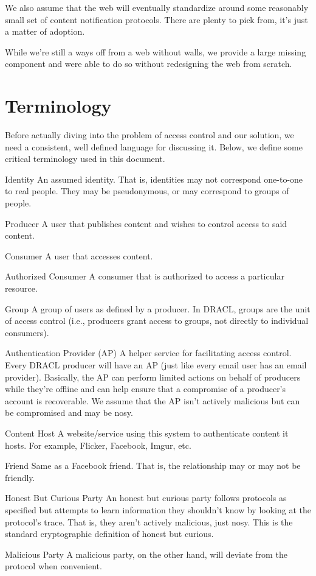 \documentclass[pdftex,12pt,a4papaer,twoside,notitlepage]{report}
\begin{document}
We also assume that the web will eventually standardize around some reasonably
small set of content notification protocols. There are plenty to pick from, it's
just a matter of adoption.

While we're still a ways off from a web without walls, we provide a large
missing component and were able to do so without redesigning the web from
scratch.

\section{Terminology}

Before actually diving into the problem of access control and our solution, we
need a consistent, well defined language for discussing it. Below, we define
some critical terminology used in this document.

\begin{compactdesc}
    \item[Identity] An assumed identity. That is, identities may not correspond
      one-to-one to real people. They may be pseudonymous, or may correspond to
      groups of people.
    \item[Producer] A user that publishes content and wishes to control
      access to said content.
    \item[Consumer] A user that accesses content.
    \item[Authorized Consumer] A consumer that is authorized to access a
      particular resource.
    \item[Group] A group of users as defined by a producer. In DRACL, groups
      are the unit of access control (i.e., producers grant access to groups,
      not directly to individual consumers).
    \item[Authentication Provider (AP)] A helper service for facilitating access
      control. Every DRACL producer will have an AP (just like every email user
      has an email provider). Basically, the AP can perform limited actions on
      behalf of producers while they're offline and can help ensure that a
      compromise of a producer's account is recoverable. We assume that the AP
      isn't actively malicious but can be compromised and may be nosy.
    \item[Content Host] A website/service using this system to authenticate
      content it hosts. For example, Flicker, Facebook, Imgur, etc.
    \item[Friend] Same as a Facebook friend. That is, the relationship may or
      may not be friendly.
    \item[Honest But Curious Party] An honest but curious party follows
      protocols as specified but attempts to learn information they shouldn't
      know by looking at the protocol's trace. That is, they aren't actively
      malicious, just nosy. This is the standard cryptographic definition of
      honest but curious.
    \item[Malicious Party] A malicious party, on the other hand, will deviate
      from the protocol when convenient.
\end{compactdesc}
\end{document}
